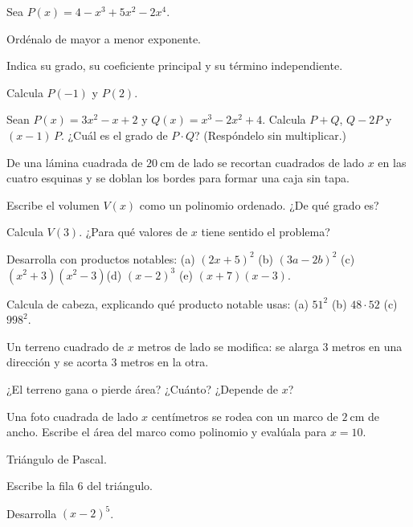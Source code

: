 \documentclass[11pt,a4paper]{article}
\begin{document}
\taller
\begin{ejercicios}
\item Sea $P(x)=4-x^{3}+5x^{2}-2x^{4}$.
  \begin{ejercicios}
  \item Ordénalo de mayor a menor exponente.
  \item Indica su grado, su coeficiente principal y su término independiente.
  \item Calcula $P(-1)$ y $P(2)$.
  \end{ejercicios}
\item Sean $P(x)=3x^2-x+2$ y $Q(x)=x^3-2x^2+4$. Calcula $P+Q$, $Q-2P$ y $(x-1)\,P$. ¿Cuál es el grado de $P\cdot Q$?
  (Respóndelo sin multiplicar.)
\item De una lámina cuadrada de $\SI{20}{\centi\metre}$ de lado se recortan cuadrados de lado $x$ en las cuatro esquinas y se
  doblan los bordes para formar una caja sin tapa.
  \begin{ejercicios}
  \item Escribe el volumen $V(x)$ como un polinomio ordenado. ¿De qué grado es?
  \item Calcula $V(3)$. ¿Para qué valores de $x$ tiene sentido el problema?
  \end{ejercicios}
\item Desarrolla con productos notables:
  (a) $(2x+5)^2$ \quad (b) $(3a-2b)^2$ \quad (c) $(x^2+3)(x^2-3)$\newline (d) $(x-2)^3$ \quad (e) $(x+7)(x-3)$.
\item Calcula de cabeza, explicando qué producto notable usas: (a) $51^2$ \quad (b) $48\cdot52$ \quad (c) $998^2$.
\item Un terreno cuadrado de $x$ metros de lado se modifica: se alarga $3$ metros en una dirección y se acorta $3$
  metros en la otra.
  \begin{ejercicios}
  \item ¿El terreno gana o pierde área? ¿Cuánto? ¿Depende de $x$?
  \item Una foto cuadrada de lado $x$ centímetros se rodea con un marco de $\SI{2}{\centi\metre}$ de ancho. Escribe el
    área del marco como polinomio y evalúala para $x=10$.
  \end{ejercicios}
\item Triángulo de Pascal.
  \begin{ejercicios}
  \item Escribe la fila $6$ del triángulo.
  \item Desarrolla $(x-2)^5$.

\end{ejercicios}
\end{ejercicios}
\end{document}
